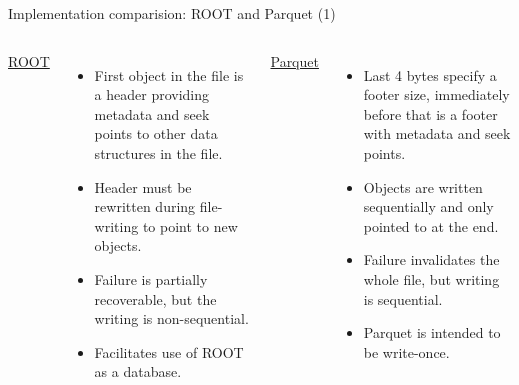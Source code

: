\documentclass[aspectratio=169]{beamer}
\begin{document}
\begin{frame}{Implementation comparision: ROOT and Parquet (1)}
\vspace{0.5 cm}
\begin{columns}[t]
{\large \underline{ROOT}}

\begin{itemize}
\item First object in the file is a header providing metadata and seek points to other data structures in the file.

\item Header must be rewritten during file-writing to point to new objects.

\item Failure is partially recoverable, but the writing is non-sequential.

\item Facilitates use of ROOT as a database.
\end{itemize}

{\large \underline{Parquet}}

\begin{itemize}
\item Last 4 bytes specify a footer size, immediately before that is a footer with metadata and seek points.

\item Objects are written sequentially and only pointed to at the end.

\item Failure invalidates the whole file, but writing is sequential.

\item Parquet is intended to be write-once.
\end{itemize}
\end{columns}
\end{frame}
\end{document}

